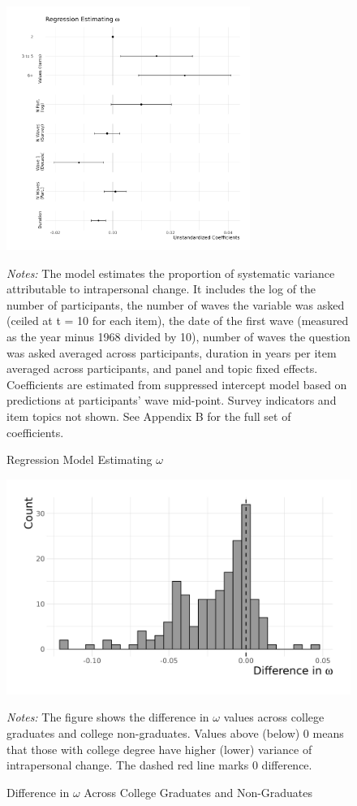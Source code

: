 \documentclass[
  12pt,
]{article}
\begin{document}
\begin{figure}[ht]
\caption{Regression Model Estimating $\omega$}

\begin{center}\includegraphics[width=300px]{../figures/figure_2} \end{center}

\textit{Notes:} The model estimates the proportion of systematic variance attributable to intrapersonal change. It includes the log of the number of participants, the number of waves the variable was asked (ceiled at t = 10 for each item), the date of the first wave (measured as the year minus 1968 divided by 10), number of waves the question was asked averaged across participants, duration in years per item averaged across participants, and panel and topic fixed effects. Coefficients are estimated from suppressed intercept model based on predictions at participants' wave mid-point. Survey indicators and item topics not shown. See Appendix B for the full set of coefficients.
\end{figure}

\newpage

\begin{figure}[ht]
\caption{Difference in $\omega$ Across College Graduates and Non-Graduates}

\begin{center}\includegraphics[width=450px]{../figures/figure_3_bw} \end{center}

\textit{Notes:} The figure shows the difference in $\omega$ values across college graduates and college non-graduates. Values above (below) 0 means that those with college degree have higher (lower) variance of intrapersonal change. The dashed red line marks 0 difference.
\end{figure}
\end{document}
